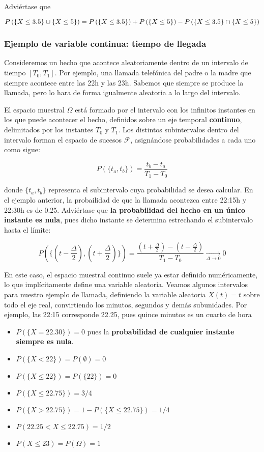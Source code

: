 \documentclass[11pt]{article}
\providecommand{\tightlist}{%
      \setlength{\itemsep}{0pt}\setlength{\parskip}{0pt}}
\begin{document}
Adviértase que

\[P\left(\{X \leq 3.5\}\cup \{X \leq 5\}\right) =\\ P\left(\{X \leq 3.5\}\right) + P\left(\{X \leq 5\}\right) - P\left(\{X \leq 3.5\}\cap \{X \leq 5\}\right)\]

    \hypertarget{ejemplo-de-variable-continua-tiempo-de-llegada}{%
\subsubsection*{Ejemplo de variable continua: tiempo de
llegada}\label{ejemplo-de-variable-continua-tiempo-de-llegada}}

Consideremos un hecho que acontece aleatoriamente dentro de un intervalo
de tiempo \([T_0, T_1]\). Por ejemplo, una llamada telefónica del padre
o la madre que siempre acontece entre las 22h y las 23h. Sabemos que
siempre se produce la llamada, pero lo hara de forma igualmente
aleatoria a lo largo del intervalo.

El espacio muestral \(\Omega\) está formado por el intervalo con los
infinitos instantes en los que puede acontecer el hecho, definidos sobre
un eje temporal \textbf{continuo}, delimitados por los instantes \(T_0\)
y \(T_1\). Los distintos subintervalos dentro del intervalo forman el
espacio de sucesos \(\mathscr{F}\), asignándose probabilidades a cada
uno como sigue:

\[P(\{t_a,t_b\})= \frac{t_b-t_a}{T_1-T_0}\]

donde \(\{t_a,t_b\}\) representa el subintervalo cuya probabilidad se
desea calcular. En el ejemplo anterior, la probailidad de que la llamada
acontezca entre 22:15h y 22:30h es de 0.25. Adviértase que \textbf{la
probabilidad del hecho en un único instante es nula}, pues dicho
instante se determina estrechando el subintervalo hasta el límite:

\[P(\{(t-\frac{\Delta}{2}),(t+\frac{\Delta}{2})\})= \frac{(t+\frac{\Delta}{2})-(t-\frac{\Delta}{2})}{T_1-T_0}
      \xrightarrow[\Delta \to 0]{} 0\]

    En este caso, el espacio muestral continuo suele ya estar definido
numéricamente, lo que implícitamente define una variable aleatoria.
Veamos algunos intervalos para nuestro ejemplo de llamada, definiendo la
variable aleatoria \(X(t) = t\) sobre todo el eje real, convirtiendo los
minutos, segundos y demás subunidades. Por ejemplo, las 22:15
corresponde 22.25, pues quince minutos es un cuarto de hora

\begin{itemize}
\tightlist
\item
  \(P(\{X=22.30\}) = 0\) pues la \textbf{probabilidad de cualquier
  instante siempre es nula}.
\item
  \(P(\{X < 22\})=P(\emptyset)=0\)
\item
  \(P(\{X \leq 22\})=P(\{22\})=0\)
\item
  \(P(\{X \leq 22.75\})=3/4\)
\item
  \(P(\{X > 22.75\}) = 1 - P(\{X \leq 22.75\}) = 1/4\)
\item
  \(P(22.25 < X \leq 22.75) = 1/2\)
\item
  \(P(X \leq 23) = P(\Omega) = 1\)
\end{itemize}


    
    
    
    
\end{document}
